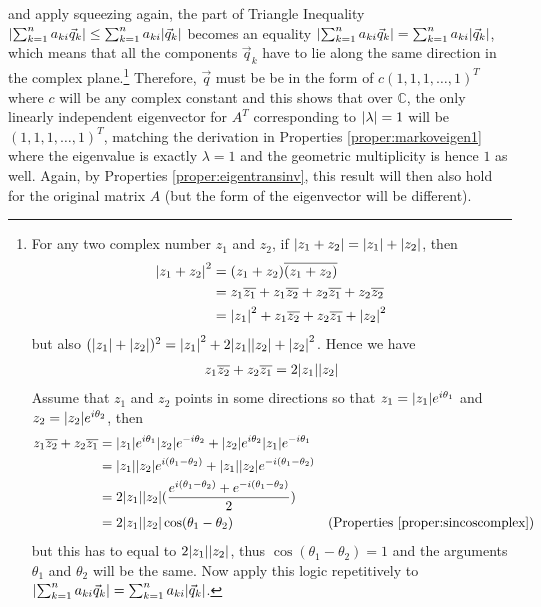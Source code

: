 and apply squeezing again, the part of Triangle Inequality $\abs{\sum_{k=1}^{n} a_{ki}\vec{q}_k} \leq \sum_{k=1}^{n} a_{ki}\abs{\vec{q}_k}$ becomes an equality $\abs{\sum_{k=1}^{n} a_{ki}\vec{q}_k} = \sum_{k=1}^{n} a_{ki}\abs{\vec{q}_k}$, which means that all the components $\vec{q}_k$ have to lie along the same direction in the complex plane.\footnote{For any two complex number $z_1$ and $z_2$, if $\abs{z_1 + z_2} = \abs{z_1} + \abs{z_2}$, then
\begin{align*}
\abs{z_1 + z_2}^2 &= (z_1 + z_2) \overline{(z_1 + z_2)} \\
&= z_1 \overline{z_1} + z_1 \overline{z_2} + z_2 \overline{z_1} + z_2 \overline{z_2} \\
&= \abs{z_1}^2 + z_1 \overline{z_2} + z_2 \overline{z_1} + \abs{z_2}^2
\end{align*}
but also
$(\abs{z_1} + \abs{z_2})^2 = \abs{z_1}^2 + 2\abs{z_1}\abs{z_2} + \abs{z_2}^2$. Hence we have
\begin{align*}
z_1 \overline{z_2} + z_2 \overline{z_1} = 2\abs{z_1}\abs{z_2}
\end{align*}
Assume that $z_1$ and $z_2$ points in some directions so that $z_1 = \abs{z_1}e^{i\theta_1}$ and $z_2 = \abs{z_2}e^{i\theta_2}$, then
\begin{align*}
z_1 \overline{z_2} + z_2 \overline{z_1} &= \abs{z_1}e^{i\theta_1} \abs{z_2}e^{-i\theta_2} + \abs{z_2}e^{i\theta_2} \abs{z_1}e^{-i\theta_1} \\
&= \abs{z_1}\abs{z_2} e^{i(\theta_1-\theta_2)} + \abs{z_1}\abs{z_2} e^{-i(\theta_1-\theta_2)} \\
&= 2 \abs{z_1}\abs{z_2} (\frac{e^{i(\theta_1-\theta_2)} + e^{-i(\theta_1-\theta_2)}}{2}) \\
&= 2 \abs{z_1}\abs{z_2} \cos(\theta_1-\theta_2) & \text{(Properties \ref{proper:sincoscomplex})}
\end{align*}
but this has to equal to $2\abs{z_1}\abs{z_2}$, thus $\cos(\theta_1-\theta_2) = 1$ and the arguments $\theta_1$ and $\theta_2$ will be the same. Now apply this logic repetitively to $\abs{\sum_{k=1}^{n} a_{ki}\vec{q}_k} = \sum_{k=1}^{n} a_{ki}\abs{\vec{q}_k}$.} Therefore, $\vec{q}$ must be be in the form of $c(1,1,1,\ldots,1)^T$ where $c$ will be any complex constant and this shows that over $\mathbb{C}$, the only linearly independent eigenvector for $A^T$ corresponding to $\abs{\lambda} = 1$ will be $(1,1,1,\ldots,1)^T$, matching the derivation in Properties \ref{proper:markoveigen1} where the eigenvalue is exactly $\lambda = 1$ and the geometric multiplicity is hence $1$ as well. Again, by Properties \ref{proper:eigentransinv}, this result will then also hold for the original matrix $A$ (but the form of the eigenvector will be different).

